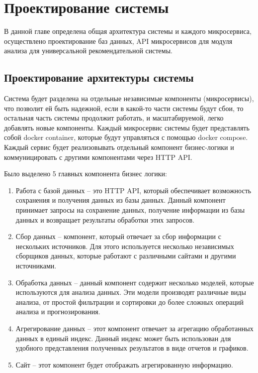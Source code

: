 \documentclass[PI, VKR]{HSEUniversity}
\begin{document}
\chapter{Проектирование системы}
\label{sec:org92fc56d}
В данной главе определена общая архитектура системы и каждого микросервиса, осуществлено проектирование баз данных, API микросервисов для модуля анализа для универсальной рекомендательной системы.
\section{Проектирование архитектуры системы}
\label{sec:org9ba8350}
Система будет разделена на отдельные независимые компоненты (микросервисы), что позволит ей быть надежной, если в какой-то части системы будут сбои, то остальная часть системы продолжит работать, и масштабируемой, легко добавлять новые компоненты. Каждый микросервис системы будет представлять собой docker container, которые будут управляться с помощью docker compose. Каждый сервис будет реализовывать отдельный компонент бизнес-логики и коммуницировать с другими компонентами через HTTP API.

Было выделено 5 главных компонента бизнес логики:
\begin{enumerate}
\item Работа с базой данных -- это HTTP API, который обеспечивает возможность сохранения и получения данных из базы данных. Данный компонент принимает запросы на сохранение данных, получение информации из базы данных и возвращает результаты обработки этих запросов.
\item Сбор данных -- компонент, который отвечает за сбор информации с нескольких источников. Для этого используется несколько независимых сборщиков данных, которые работают с различными сайтами и другими источниками.
\item Обработка данных -- данный компонент содержит несколько моделей, которые используются для анализа данных. Эти модели производят различные виды анализа, от простой фильтрации и сортировки до более сложных операций анализа и прогнозирования.
\item Агрегирование данных -- этот компонент отвечает за агрегацию обработанных данных в единый индекс. Данный индекс может быть использован для удобного представления полученных результатов в виде отчетов и графиков.
\item Сайт -- этот компонент будет отображать агрегированную информацию.
\end{enumerate}
\end{document}
